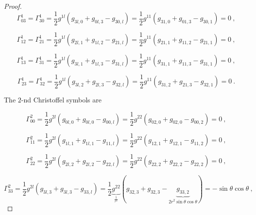 \begin{proof}
        \begin{equation*}
            \Gamma^1_{03} = \Gamma^1_{30} = \frac{1}{2} g^{1l} (g_{3l,0} + g_{0l,3} - g_{30,l}) =  \frac{1}{2} g^{11} (g_{31,0} + g_{01,3} - g_{30,1}) = 0 ~,
        \end{equation*}

        \begin{equation*}
            \Gamma^1_{12} = \Gamma^1_{21} = \frac{1}{2} g^{1l} (g_{2l,1} + g_{1l,2} - g_{21,l}) =  \frac{1}{2} g^{11} (g_{21,1} + g_{11,2} - g_{21,1}) = 0 ~,
        \end{equation*}
        
        \begin{equation*}
            \Gamma^1_{13} = \Gamma^1_{31} = \frac{1}{2} g^{1l} (g_{3l,1} + g_{1l,3} - g_{31,l}) =  \frac{1}{2} g^{11} (g_{31,1} + g_{11,3} - g_{31,1}) = 0 ~,
        \end{equation*}

        \begin{equation*}
            \Gamma^1_{23} = \Gamma^1_{32} = \frac{1}{2} g^{1l} (g_{3l,2} + g_{2l,3} - g_{32,l}) =  \frac{1}{2} g^{11} (g_{31,2} + g_{21,3} - g_{32,1}) = 0 ~.
        \end{equation*}
        
        The $2$-nd Christoffel symbols are

        \begin{equation*}
            \Gamma^2_{00} = \frac{1}{2} g^{2l} (g_{0l,0} + g_{0l,0} - g_{00,l}) =  \frac{1}{2} g^{22} (g_{02,0} + g_{02,0} - g_{00,2}) = 0 ~,
        \end{equation*}

        \begin{equation*}
            \Gamma^2_{11} = \frac{1}{2} g^{2l} (g_{1l,1} + g_{1l,1} - g_{11,l}) =  \frac{1}{2} g^{22} (g_{12,1} + g_{12,1} - g_{11,2}) = 0 ~, 
        \end{equation*}

        \begin{equation*}
            \Gamma^2_{22} = \frac{1}{2} g^{2l} (g_{2l,2} + g_{2l,2} - g_{22,l}) =  \frac{1}{2} g^{22} (g_{22,2} + g_{22,2} - g_{22,2}) = 0 ~,
        \end{equation*}

        \begin{equation*}
            \Gamma^2_{33} = \frac{1}{2} g^{2l} (g_{3l,3} + g_{3l,3} - g_{33,l}) =  \frac{1}{2} \underbrace{g^{22}}_{\frac{1}{r^2}} (g_{32,3} + g_{32,3} - \underbrace{g_{33,2}}_{2 r^2 \sin \theta \cos \theta}) = - \sin \theta \cos \theta ~, 
        \end{equation*}


\end{proof}
